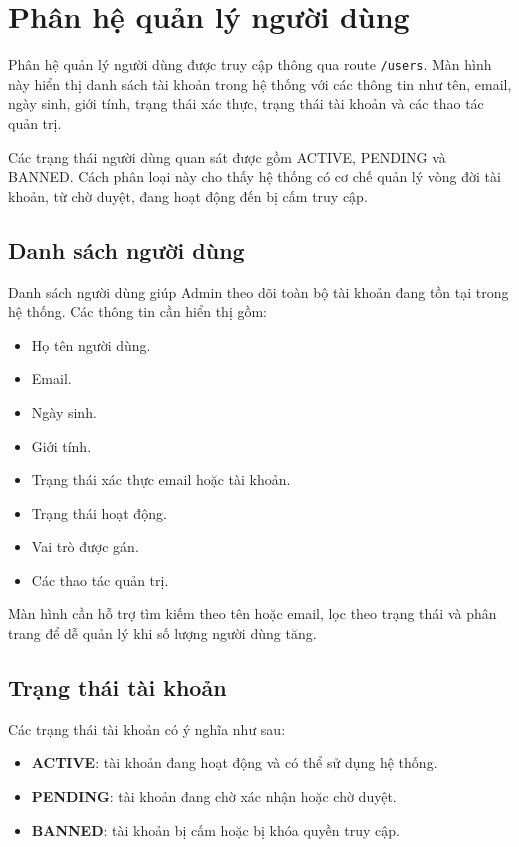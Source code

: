 \section{Phân hệ quản lý người dùng}

Phân hệ quản lý người dùng được truy cập thông qua route \texttt{/users}. Màn hình này hiển thị danh sách tài khoản trong hệ thống với các thông tin như tên, email, ngày sinh, giới tính, trạng thái xác thực, trạng thái tài khoản và các thao tác quản trị.

Các trạng thái người dùng quan sát được gồm ACTIVE, PENDING và BANNED. Cách phân loại này cho thấy hệ thống có cơ chế quản lý vòng đời tài khoản, từ chờ duyệt, đang hoạt động đến bị cấm truy cập.

\subsection{Danh sách người dùng}

Danh sách người dùng giúp Admin theo dõi toàn bộ tài khoản đang tồn tại trong hệ thống. Các thông tin cần hiển thị gồm:

\begin{itemize}
    \item Họ tên người dùng.
    \item Email.
    \item Ngày sinh.
    \item Giới tính.
    \item Trạng thái xác thực email hoặc tài khoản.
    \item Trạng thái hoạt động.
    \item Vai trò được gán.
    \item Các thao tác quản trị.
\end{itemize}

Màn hình cần hỗ trợ tìm kiếm theo tên hoặc email, lọc theo trạng thái và phân trang để dễ quản lý khi số lượng người dùng tăng.

\subsection{Trạng thái tài khoản}

Các trạng thái tài khoản có ý nghĩa như sau:

\begin{itemize}
    \item \textbf{ACTIVE}: tài khoản đang hoạt động và có thể sử dụng hệ thống.
    \item \textbf{PENDING}: tài khoản đang chờ xác nhận hoặc chờ duyệt.
    \item \textbf{BANNED}: tài khoản bị cấm hoặc bị khóa quyền truy cập.
\end{itemize}

